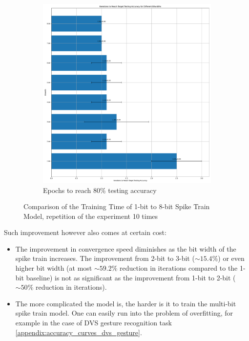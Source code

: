\begin{figure}[!htpb]
\begin{subfigure}[H]{0.47\textwidth}
                \includegraphics[width=\textwidth]{../standard/FashionMNIST/plots/fashionmnist_test_iters.pdf}
                \caption{Epochs to reach 80\% testing accuracy}
            \end{subfigure}
            \caption{Comparison of the Training Time of 1-bit to 8-bit Spike Train Model, repetition of the experiment 10 times}
            \label{fig:iterations_fixed_accuracy}
        \end{figure}

        Such improvement however also comes at certain cost:
        \begin{itemize}
            \item The improvement in convergence speed diminishes as the bit width of the spike train increases. The improvement from 2-bit to 3-bit ($\sim 15.4\%$) or even higher bit width (at most $\sim 59.2\%$ reduction in iterations compared to the 1-bit baseline) is not as significant as the improvement from 1-bit to 2-bit ($\sim 50\%$ reduction in iterations).
            \item The more complicated the model is, the harder is it to train the multi-bit spike train model. One can easily run into the problem of overfitting, for example in the case of DVS gesture recognition task \ref{appendix:accuracy_curves_dvs_gesture}.
        \end{itemize}

